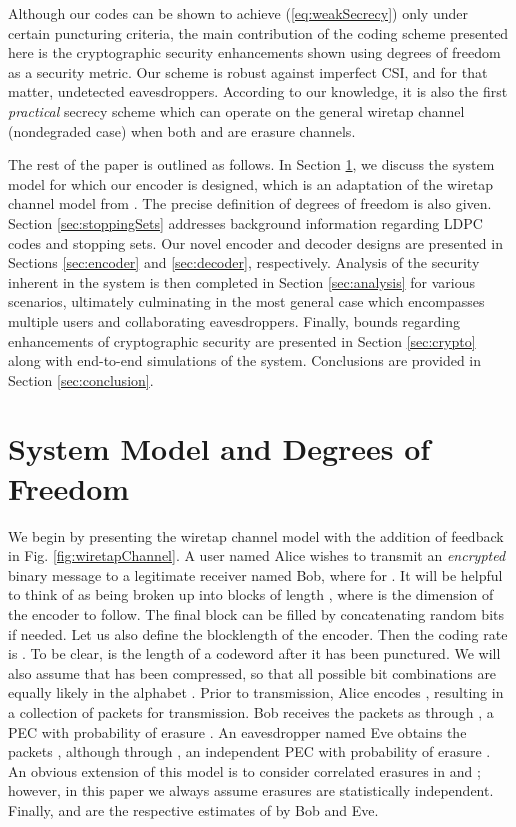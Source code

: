 \documentclass[10pt,twocolumn,twoside]{IEEEtran} \newlength{\pic}
\theoremstyle{definition}
\theoremstyle{remark}
\theoremstyle{plain}
\begin{document}
Although our codes can be shown to achieve (\ref{eq:weakSecrecy}) only under certain puncturing criteria, the main contribution of the coding scheme presented here is the cryptographic security enhancements shown using degrees of freedom as a security metric. Our scheme is robust against imperfect CSI, and for that matter, undetected eavesdroppers. According to our knowledge, it is also the first \emph{practical} secrecy scheme which can operate on the general wiretap channel (nondegraded case) when both  and  are erasure channels.

The rest of the paper is outlined as follows. In Section \ref{sec:system}, we discuss the system model for which our encoder is designed, which is an adaptation of the wiretap channel model from \cite{Wyner75}. The precise definition of degrees of freedom is also given. Section \ref{sec:stoppingSets} addresses background information regarding LDPC codes and stopping sets. Our novel encoder and decoder designs are presented in Sections \ref{sec:encoder} and \ref{sec:decoder}, respectively. Analysis of the security inherent in the system is then completed in Section \ref{sec:analysis} for various scenarios, ultimately culminating in the most general case which encompasses multiple users and collaborating eavesdroppers. Finally, bounds regarding enhancements of cryptographic security are presented in Section \ref{sec:crypto} along with end-to-end simulations of the system. Conclusions are provided in Section \ref{sec:conclusion}.

\section{System Model and Degrees of Freedom}\label{sec:system}

We begin by presenting the wiretap channel model \cite{BlochBook} with the addition of feedback in Fig. \ref{fig:wiretapChannel}. A user named Alice wishes to transmit an \emph{encrypted} binary message  to a legitimate receiver named Bob, where  for . It will be helpful to think of  as being broken up into  blocks of length , where  is the dimension of the encoder to follow. The final block  can be filled by concatenating random bits if needed. Let us also define the blocklength  of the encoder. Then the coding rate is . To be clear,  is the length of a codeword after it has been punctured. We will also assume that  has been compressed, so that all possible bit combinations are equally likely in the alphabet . Prior to transmission, Alice encodes , resulting in a collection of  packets  for transmission. Bob receives the packets as  through , a PEC with probability of erasure . An eavesdropper named Eve obtains the packets , although through , an independent PEC with probability of erasure . An obvious extension of this model is to consider correlated erasures in  and ; however, in this paper we always assume erasures are statistically independent. Finally,  and  are the respective estimates of  by Bob and Eve.
\end{document}

